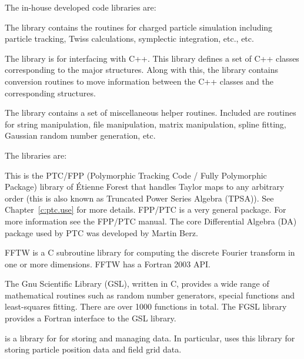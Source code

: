 {{{{{{The in-house developed code libraries are:
\begin{description}
  \item[bmad] \Newline
The  library contains the routines for charged particle simulation including
particle tracking, Twiss calculations, symplectic integration, etc., etc.
  \item[cpp_bmad_interface]
The  library is for interfacing \bmad with C++.  This library defines a set
of C++ classes corresponding to the major \bmad structures. Along with this, the library contains
conversion routines to move information between the C++ classes and the corresponding \bmad
structures.
  \item[sim_utils] \Newline
The  library contains a set of miscellaneous helper routines.  Included are routines
for string manipulation, file manipulation, matrix manipulation, spline fitting, Gaussian random
number generation, etc.
\end{description}
%  
The  libraries are:
\begin{description}
  \item[forest] \Newline
This is the PTC/FPP (Polymorphic Tracking Code / Fully Polymorphic Package) library of \'Etienne
Forest that handles Taylor maps to any arbitrary order (this is also known as Truncated Power Series
Algebra (TPSA)). See Chapter~\ref{c:ptc.use} for more details.  FPP/PTC is a very general
package. For more information see the FPP/PTC manual\cite{b:ptc}. The core Differential Algebra (DA)
package used by PTC was developed by Martin Berz\cite{b:berz}.
%
  \item[fftw] \Newline
FFTW is a C subroutine library for computing the discrete Fourier transform in one or more
dimensions. FFTW has a Fortran 2003 API.
%
  \item[gsl / fgsl] \Newline
The Gnu Scientific Library (GSL), written in C, provides a wide range of mathematical routines such
as random number generators, special functions and least-squares fitting. There are over 1000
functions in total. The FGSL library provides a Fortran interface to the GSL library.
%
  \item[hdf5] \Newline
{} is a library for for storing and managing data\cite{b:hdf5}. In particular, \bmad uses
this library for storing particle position data and field grid data.
%

\end{description}}}}}}}
